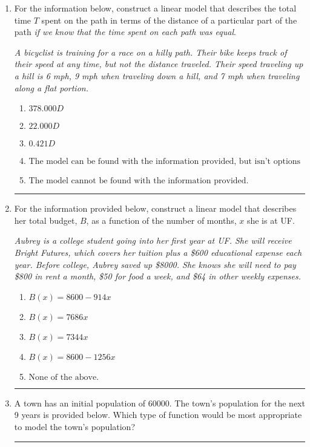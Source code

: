 \documentclass[14pt]{extbook}
\newcommand{\litem}[1]{\item#1\hspace*{-1cm}\rule{\textwidth}{0.4pt}}
\begin{document}
\begin{enumerate}
{\begin{enumerate}[label=\Alph*.]
\end{enumerate} }
\litem{
For the information below, construct a linear model that describes the total time $T$ spent on the path in terms of the distance of a particular part of the path \textit{if we know that the time spent on each path was equal}.
\begin{center}
    \textit{ A bicyclist is training for a race on a hilly path. Their bike keeps track of their speed at any time, but not the distance traveled. Their speed traveling up a hill is 6 mph, 9 mph when traveling down a hill, and 7 mph when traveling along a flat portion. }
\end{center}
\begin{enumerate}[label=\Alph*.]
\item \( 378.000 D \)
\item \( 22.000 D \)
\item \( 0.421 D \)
\item \( \text{The model can be found with the information provided, but isn't options 1-3.} \)
\item \( \text{The model cannot be found with the information provided.} \)

\end{enumerate} }
\litem{
For the information provided below, construct a linear model that describes her total budget, $B$, as a function of the number of months, $x$ she is at UF.
\begin{center}
    \textit{ Aubrey is a college student going into her first year at UF. She will receive Bright Futures, which covers her tuition plus a \$600 educational expense each year. Before college, Aubrey saved up \$8000. She knows she will need to pay \$800 in rent a month, \$50 for food a week, and \$64 in other weekly expenses. }
\end{center}
\begin{enumerate}[label=\Alph*.]
\item \( B(x) = 8600 - 914 x \)
\item \( B(x) = 7686 x \)
\item \( B(x) = 7344 x \)
\item \( B(x) = 8600 - 1256 x \)
\item \( \text{None of the above.} \)

\end{enumerate} }
\litem{
A town has an initial population of 60000. The town's population for the next 9 years is provided below. Which type of function would be most appropriate to model the town's population?

}
\end{enumerate}
\end{document}
